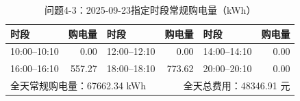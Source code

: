 \begin{table}[H]\centering\small
\caption{问题4-3：2025-09-23指定时段常规购电量（kWh）}
\label{tab:q4_3_0923_purchase}
\begin{tabular}{lrlrlr}\toprule
时段 & 购电量 & 时段 & 购电量 & 时段 & 购电量 \\\midrule
10:00--10:10 & 0.00 & 12:00--12:10 & 0.00 & 14:00--14:10 & 0.00 \\
16:00--16:10 & 557.27 & 18:00--18:10 & 773.62 & 20:00--20:10 & 0.00 \\
\midrule
\multicolumn{3}{l}{全天常规购电量：67662.34 kWh} & \multicolumn{3}{r}{全天总费用：48346.91 元}\\
\bottomrule\end{tabular}\end{table}
